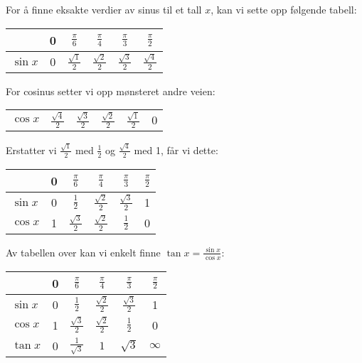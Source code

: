 




\begin{comment}
	\chapter*{Vedlegg A-H \label{Tips} \addcontentsline{toc}{chapter}{Vedlegg A-H}}
	\vspace{20 pt}
\end{comment}	
For å finne eksakte verdier av sinus til et tall $ x $, kan vi sette opp følgende tabell:\vs \renewcommand{\arraystretch}{1.5}	
\begin{center}
	\begin{tabular}{l|c|c|c|c|c|}
		& 0&$\frac{\pi}{6}$ & $\frac{\pi}{4}$ &$\frac{\pi}{3}$ & $\frac{\pi}{2}$    \\
		\hline
		$\sin x$ & 0 &$\frac{\sqrt{1}}{2}$ & $\frac{\sqrt{2}}{2}$ & $\frac{\sqrt{3}}{2}$ & $ \frac{\sqrt{4}}{2} $ \\
	\end{tabular}
\end{center}
For cosinus setter vi opp mønsteret andre veien:
\begin{center}
	\begin{tabular}{l|c|c|c|c|c}
		$\cos x$ & $\frac{\sqrt{4}}{2}  $ & $\frac{\sqrt{3}}{2}$ & $\frac{\sqrt{2}}{2}$ & $\frac{\sqrt{1}}{2}$ & 0 \\
	\end{tabular}
\end{center}
Erstatter vi $ {\frac{\sqrt{1}}{2}} $ med $ \frac{1}{2} $ og $ \frac{\sqrt{4}}{2} $ med 1, får vi dette:

\begin{center}
	\renewcommand{\arraystretch}{1.5}	
	\begin{tabular}{l|c|c|c|c|c}
		& 0&$\frac{\pi}{6}$ & $\frac{\pi}{4}$ &$\frac{\pi}{3}$ & $\frac{\pi}{2}$    \\
		\hline
		$\sin x$ & 0 &$\frac{1}{2}$ & $\frac{\sqrt{2}}{2}$ & $\frac{\sqrt{3}}{2}$ & 1 \\
		$\cos x$ & 1 & $\frac{\sqrt{3}}{2}$ & $\frac{\sqrt{2}}{2}$ & $\frac{1}{2}$ & 0 \\
	\end{tabular}
\end{center}
Av tabellen over kan vi enkelt finne $\tan x= \frac{\sin x}{\cos x} $:
\begin{center}
	\renewcommand{\arraystretch}{1.5}	
	\begin{tabular}{l|c|c|c|c|c}
		& 0&$\frac{\pi}{6}$ & $\frac{\pi}{4}$ &$\frac{\pi}{3}$ & $\frac{\pi}{2}$    \\
		\hline
		$\sin x$ & 0 &$\frac{1}{2}$ & $\frac{\sqrt{2}}{2}$ & $\frac{\sqrt{3}}{2}$ & 1 \\
		$\cos x$ & 1 & $\frac{\sqrt{3}}{2}$ & $\frac{\sqrt{2}}{2}$ & $\frac{1}{2}$ & 0 \\
		$\tan x$ & 0 &$\frac{1}{\sqrt{3}}$ & $1$ & $\sqrt{3}$ & $ \infty  $
	\end{tabular}
\end{center}

